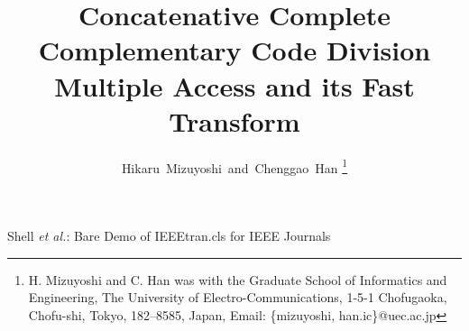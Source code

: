 \documentclass[journal,draftcls,onecolumn,12pt,twoside]{IEEEtran}
\begin{document}
\title{Concatenative Complete Complementary Code Division Multiple Access and its Fast Transform}

\author{Hikaru~Mizuyoshi~and~Chenggao~Han%
\thanks{H. Mizuyoshi and C. Han was with the Graduate School of Informatics and Engineering, The University of Electro-Communications, 1-5-1 Chofugaoka, Chofu-shi, Tokyo, 182--8585, Japan, Email: \{mizuyoshi, han.ic\}@uec.ac.jp}}
%
{Shell \MakeLowercase{\textit{et al.}}: Bare Demo of IEEEtran.cls for IEEE Journals}


\maketitle





\newpage

\newpage

\newpage

\newpage

\newpage

\newpage

\end{document}
